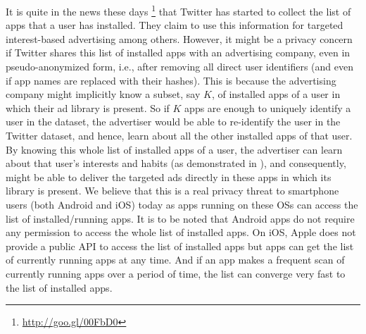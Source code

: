 \documentclass{acm_proc_article-sp}
\theoremstyle{plain}
\theoremstyle{plain}
\theoremstyle{plain}
\theoremstyle{plain}
\theoremstyle{plain}
\theoremstyle{plain}
\begin{document}
It is quite in the news these days
\footnote{\url{http://goo.gl/00FbD0}}
that Twitter has started to collect the list of apps that a user has installed.
They claim to use this information for targeted interest-based advertising among others.
However, it might be a privacy concern if Twitter shares this list of installed apps with an advertising company, even in pseudo-anonymized form, i.e., after removing all direct user identifiers (and even if app names are replaced with their hashes).
This is because the advertising company might implicitly know a subset, say $K$, of installed apps of a user in which their ad library is present.
So if $K$ apps are enough to uniquely identify a user in the dataset, the advertiser would be able to re-identify the user in the Twitter dataset, and hence, learn about all the other installed apps of that user.
By knowing this whole list of installed apps of a user, the advertiser can learn about that user's interests and habits (as demonstrated in \cite{Seneviratne:2014}), and consequently, might be able to deliver the targeted ads directly in these apps in which its library is present. We believe that this is a real privacy threat to smartphone users (both Android and iOS) today as apps running on these OSs can access the list of installed/running apps.
It is to be noted that Android apps do not require any permission to access the whole list of installed apps.
On iOS, Apple does not provide a public API to access the list of installed apps but apps can get the list of currently running apps at any time.
And if an app makes a frequent scan of currently running apps over a period of time, the list can converge very fast to the list of installed apps.
 
\end{document}
